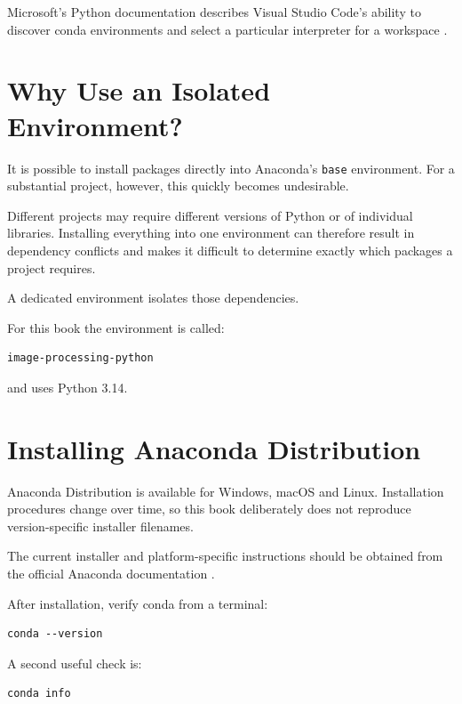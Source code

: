 Microsoft's Python documentation describes Visual Studio Code's
ability to discover conda environments and select a particular
interpreter for a workspace \cite{vscode_python_environments}.


\section{Why Use an Isolated Environment?}
\label{sec:why-conda-environment}

It is possible to install packages directly into Anaconda's
\texttt{base} environment. For a substantial project, however, this
quickly becomes undesirable.

Different projects may require different versions of Python or of
individual libraries. Installing everything into one environment can
therefore result in dependency conflicts and makes it difficult to
determine exactly which packages a project requires.

A dedicated environment isolates those dependencies.

For this book the environment is called:

\begin{verbatim}
image-processing-python
\end{verbatim}

and uses Python 3.14.


\section{Installing Anaconda Distribution}
\label{sec:install-anaconda}

Anaconda Distribution is available for Windows, macOS and Linux.
Installation procedures change over time, so this book deliberately
does not reproduce version-specific installer filenames.

The current installer and platform-specific instructions should be
obtained from the official Anaconda documentation
\cite{anaconda_install}.

After installation, verify conda from a terminal:

\begin{verbatim}
conda --version
\end{verbatim}

A second useful check is:

\begin{verbatim}
conda info
\end{verbatim}

